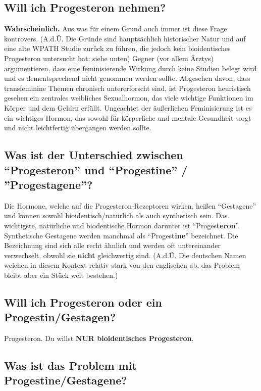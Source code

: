 \documentclass{article}
\begin{document}
\subsection{Will ich Progesteron nehmen?}

\textbf{Wahrscheinlich.} Aus was für einem Grund auch immer ist diese Frage kontrovers. (A.d.Ü. Die Gründe sind hauptsächlich historischer Natur und auf eine alte WPATH Studie zurück zu führen, die jedoch kein bioidentisches Progesteron untersucht hat; siehe unten) Gegner (vor allem Ärztys) argumentieren, dass eine feminisierende Wirkung durch keine Studien belegt wird und es dementsprechend nicht genommen werden sollte. Abgesehen davon, dass transfeminine Themen chronisch untererforscht sind, ist Progesteron heuristisch gesehen ein zentrales weibliches Sexualhormon, das viele wichtige Funktionen im Körper und dem Gehirn erfüllt. Ungeachtet der äußerlichen Feminisierung ist es ein wichtiges Hormon, das sowohl für körperliche und mentale Gesundheit sorgt und nicht leichtfertig übergangen werden sollte.

\subsection{Was ist der Unterschied zwischen “Progesteron” und “Progestine” / ”Progestagene”?}

Die Hormone, welche auf die Progesteron-Rezeptoren wirken, heißen “Gestagene” und können sowohl bioidentisch/natürlich als auch synthetisch sein. Das wichtigste, natürliche und biodentische Hormon darunter ist “Proges\textbf{teron}”. Synthetische Gestagene werden manchmal als “Proges\textbf{tine}” bezeichnet. Die Bezeichnung sind sich alle recht ähnlich und werden oft untereinander verwechselt, obwohl sie \textbf{nicht }gleichwertig sind. (A.d.Ü. Die deutschen Namen weichen in diesem Kontext relativ stark von den englischen ab, das Problem bleibt aber ein Stück weit bestehen.)

\subsection{Will ich Progesteron oder ein Progestin/Gestagen?}

Progesteron. Du willst \textbf{NUR bioidentisches Progesteron}.

\subsection{Was ist das Problem mit Progestine/Gestagene?}
\end{document}
